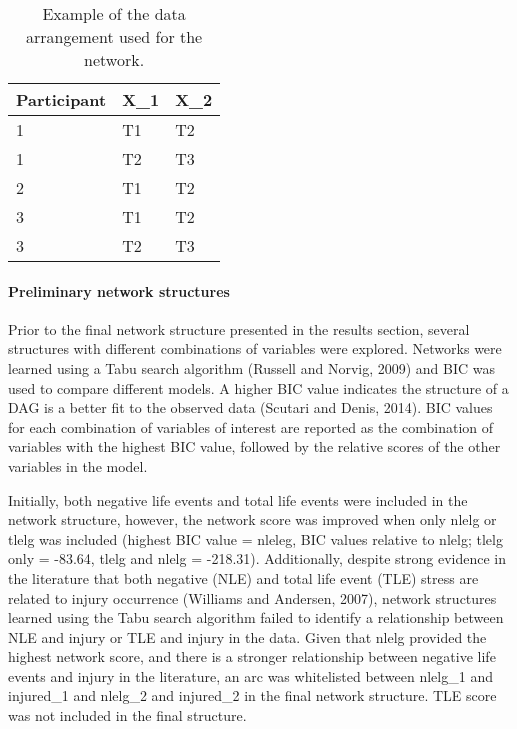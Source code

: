 \documentclass[
  english,
  man]{apa6}
\let\oldparagraph\paragraph
\renewcommand{\paragraph}[1]{\oldparagraph{#1}\mbox{}}
\begin{document}
\begin{table}[H]

\caption{\label{tab:table2}Example of the data arrangement used for the network.}
\centering
\begin{tabular}[t]{l|l|l}
\hline
\textbf{Participant} & \textbf{X\_1} & \textbf{X\_2}\\
\hline
1 & T1 & T2\\
\hline
1 & T2 & T3\\
\hline
2 & T1 & T2\\
\hline
3 & T1 & T2\\
\hline
3 & T2 & T3\\
\hline
\end{tabular}
\end{table}

\hypertarget{preliminary-network-structures}{%
\paragraph{Preliminary network structures}\label{preliminary-network-structures}}

Prior to the final network structure presented in the results section, several structures with different combinations of variables were explored. Networks were learned using a Tabu search algorithm (Russell and Norvig, 2009) and BIC was used to compare different models. A higher BIC value indicates the structure of a DAG is a better fit to the observed data (Scutari and Denis, 2014). BIC values for each combination of variables of interest are reported as the combination of variables with the highest BIC value, followed by the relative scores of the other variables in the model.

Initially, both negative life events and total life events were included in the network structure, however, the network score was improved when only nlelg or tlelg was included (highest BIC value = nleleg, BIC values relative to nlelg; tlelg only = -83.64, tlelg and nlelg = -218.31).
Additionally, despite strong evidence in the literature that both negative (NLE) and total life event (TLE) stress are related to injury occurrence (Williams and Andersen, 2007), network structures learned using the Tabu search algorithm failed to identify a relationship between NLE and injury or TLE and injury in the data.
Given that nlelg provided the highest network score, and there is a stronger relationship between negative life events and injury in the literature, an arc was whitelisted between nlelg\_1 and injured\_1 and nlelg\_2 and injured\_2 in the final network structure. TLE score was not included in the final structure.
\end{document}
